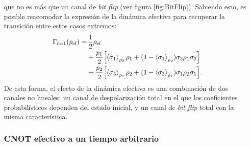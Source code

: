 que no es más que un canal de \textit{bit flip} (ver figura \ref{fig:BitFlip}). Sabiendo esto, es posible reacomodar la expresión de la dinámica efectiva para recuperar la transición entre estos casos extremos:
\begin{align}
  \Gamma_{t=1}(\rho_{\text{ef}})=&\,\frac{1}{2}\rho_{\text{ef}}\nonumber\\
  &+\frac{p_{1}}{2}\qty[\expval{\sigma_{1}}_{\rho_{2}}\rho_{1}+(1-\expval{\sigma_{1}}_{\rho_{2}})\sigma_{3}\rho_{1}\sigma_{3}]\nonumber\\
  &+\frac{p_{2}}{2}\qty[\expval{\sigma_{3}}_{\rho_{1}}\rho_{2}+(1-\expval{\sigma_{3}}_{\rho_{1}})\sigma_{1}\rho_{2}\sigma_{1}].\nonumber
\end{align}
De esta forma, el efecto de la dinámica efectiva es una combinación de dos canales no lineales: un canal de despolarización total en el que los coeficientes probabilísticos dependen del estado inicial, y un canal de \textit{bit flip} total con la misma característica. 

\subsubsection{CNOT efectivo a un tiempo arbitrario}

